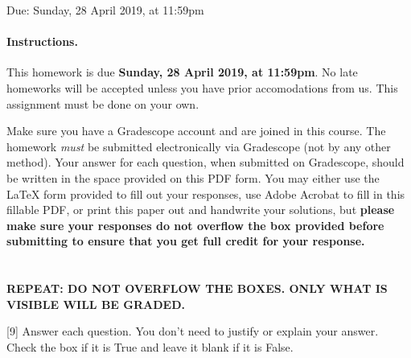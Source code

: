 \documentclass[12pt]{exam}
\newcommand{\checkbox}[3]{%
\iftoggle{pdfform}{%
\CheckBox[name = #1, backgroundcolor=white, bordercolor=black, #2]{}%
}{%
\ifprintanswers\else%
\framebox[0.6cm]{\rule{0pt}{0.4cm}#3}
\fi%
}%
}
\newcommand{\tf}[3]{\checkbox{#1}{}{#3} \quad #2}
\def\duedate{Sunday, 28 April 2019}
\begin{document}
\begin{Form}

\begin{center}
  \large
  Due: \duedate, at 11:59pm
\end{center}

\paragraph{Instructions.}
This homework is due \textbf{\duedate, at 11:59pm}. No late homeworks will be accepted unless you have prior accomodations from us.
This assignment must be done on your own.

Make sure you have a Gradescope account and are joined in this course.  The
homework \emph{must} be submitted electronically via Gradescope (not by
any other method).  Your answer for each question,
when submitted on Gradescope, should be written in the space provided on this PDF form. You may either use the LaTeX form provided to fill out your responses, use Adobe Acrobat to fill in this fillable PDF, or print this paper out and handwrite your solutions, but \textbf{please make sure your responses do not overflow the box provided before submitting to ensure that you get full credit for your response.}
\\\\\\
\textbf{\large \color{red} REPEAT: DO NOT OVERFLOW THE BOXES. ONLY WHAT IS VISIBLE WILL BE GRADED.}

\begin{questions}

\newpage

[9] Answer each question.  You don't need to justify or explain your answer. Check the box if it is True and leave it blank if it is False.

\end{questions}
\end{Form}
\end{document}

